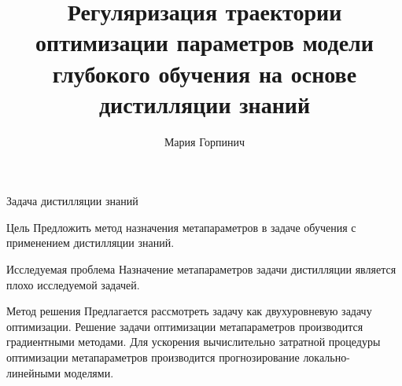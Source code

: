 \documentclass[10pt, aspectratio=169]{beamer}
\title[\hbox to 56mm{Оптимизация параметров модели на основе дистилляции знаний}]{Регуляризация траектории оптимизации 
параметров модели глубокого обучения на основе дистилляции знаний}
\author[М. Горипинич]{Мария Горпинич}
\institute{\fontsize{11}{14}\selectfontМосковский физико-технический институт}
\date{\footnotesize
\par\smallskip\emph{Курс:} Автоматизация научных исследований\par (практика, В.\,В.~Стрижов)/Группа 874
\par\smallskip\emph{Эксперт:} В.\,В.~Стрижов
\par\smallskip\emph{Консультант:} О.\,Ю.~Бахтеев
\par\bigskip\small 2021}
\begin{document}
\begin{frame}
\thispagestyle{empty}
\maketitle
\end{frame}
\begin{frame}{Задача дистилляции знаний}
\begin{block}{Цель}
    Предложить метод назначения метапараметров в  задаче обучения с применением дистилляции знаний.
\end{block}
\begin{block}{Исследуемая проблема}
    Назначение метапараметров задачи дистилляции является плохо исследуемой задачей.
\end{block}
\begin{block}{Метод решения}
    Предлагается рассмотреть задачу как двухуровневую задачу оптимизации. Решение задачи оптимизации метапараметров производится градиентными методами. Для ускорения вычислительно затратной процедуры оптимизации метапараметров производится прогнозирование локально-линейными моделями.
\end{block}
\end{frame}
\end{document}
